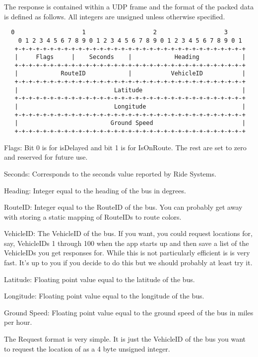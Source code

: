 \documentclass[11pt,letterpaper]{article}
\begin{document}
\noindent The response is contained within a UDP frame and the format of the packed data is defined as follows. All integers are unsigned unless otherwise specified. 

\begin{verbatim}
  0                   1                   2                   3
    0 1 2 3 4 5 6 7 8 9 0 1 2 3 4 5 6 7 8 9 0 1 2 3 4 5 6 7 8 9 0 1
   +-+-+-+-+-+-+-+-+-+-+-+-+-+-+-+-+-+-+-+-+-+-+-+-+-+-+-+-+-+-+-+-+
   |     Flags     |    Seconds    |            Heading            |
   +-+-+-+-+-+-+-+-+-+-+-+-+-+-+-+-+-+-+-+-+-+-+-+-+-+-+-+-+-+-+-+-+
   |            RouteID            |           VehicleID           |
   +-+-+-+-+-+-+-+-+-+-+-+-+-+-+-+-+-+-+-+-+-+-+-+-+-+-+-+-+-+-+-+-+
   |                           Latitude                            |
   +-+-+-+-+-+-+-+-+-+-+-+-+-+-+-+-+-+-+-+-+-+-+-+-+-+-+-+-+-+-+-+-+
   |                           Longitude                           |
   +-+-+-+-+-+-+-+-+-+-+-+-+-+-+-+-+-+-+-+-+-+-+-+-+-+-+-+-+-+-+-+-+
   |                          Ground Speed                         |
   +-+-+-+-+-+-+-+-+-+-+-+-+-+-+-+-+-+-+-+-+-+-+-+-+-+-+-+-+-+-+-+-+
\end{verbatim}

\noindent Flags: Bit 0 is for isDelayed and bit 1 is for IsOnRoute. The rest are set to zero and reserved for future use. 

\noindent Seconds: Corresponds to the seconds value reported by Ride Systems. 

\noindent Heading: Integer equal to the heading of the bus in degrees. 

\noindent RouteID: Integer equal to the RouteID of the bus. You can probably get away with storing a static mapping of RouteIDs to route colors. 

\noindent VehicleID: The VehicleID of the bus. If you want, you could request locations for, say, VehicleIDs 1 through 100 when the app starts up and then save a list of the VehicleIDs you get responses for. While this is not particularly efficient is is very fast. It's up to you if you decide to do this but we should probably at least try it. 

\noindent Latitude: Floating point value equal to the latitude of the bus.

\noindent Longitude: Floating point value equal to the longitude of the bus.

\noindent Ground Speed: Floating point value equal to the ground speed of the bus in miles per hour. 

The Request format is very simple. It is just the VehicleID of the bus you want to request the location of as a 4 byte unsigned integer. 
\end{document}
